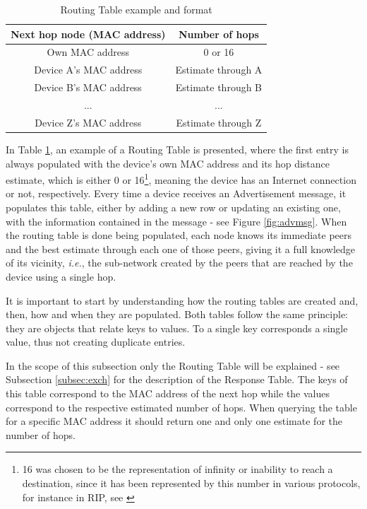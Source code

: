 \begin{table}[ht]
\centering
\bgroup
\def\arraystretch{2.5}
\begin{tabular}{|c|c|}
\hline
\textbf{Next hop node (MAC address)} & \textbf{Number of hops} \\ \hline
Own MAC address & 0 or 16 \\ \hline
Device A's MAC address & Estimate through A \\ \hline
Device B's MAC address & Estimate through B \\ \hline
... & ... \\ \hline
Device Z's MAC address & Estimate through Z \\ \hline
\end{tabular}
\egroup
\caption{Routing Table example and format}
\label{tab:routTables}
\end{table}

In Table \ref{tab:routTables}, an example of a Routing Table is presented, where the first entry is always populated with the device's own \gls{MAC} address and its hop distance estimate, which is either 0 or 16\footnote{16 was chosen to be the representation of infinity or inability to reach a destination, since it has been represented by this number in various protocols, for instance in \gls{RIP}, see \cite{ripprotocol}}, meaning the device has an Internet connection or not, respectively. Every time a device receives an Advertisement message, it populates this table, either by adding a new row or updating an existing one, with the information contained in the message - see Figure \ref{fig:advmsg}. When the routing table is done being populated, each node knows its immediate peers and the best estimate through each one of those peers, giving it a full knowledge of its vicinity, \textit{i.e.}, the sub-network created by the peers that are reached by the device using a single hop.

It is important to start by understanding how the routing tables are created and, then, how and when they are populated. Both tables follow the same principle: they are objects that relate keys to values. To a single key corresponds a single value, thus not creating duplicate entries.

In the scope of this subsection only the Routing Table will be explained - see Subsection \ref{subsec:exch} for the description of the Response Table. The keys of this table correspond to the \gls{MAC} address of the next hop while the values correspond to the respective estimated number of hops. When querying the table for a specific \gls{MAC} address it should return one and only one estimate for the number of hops.

